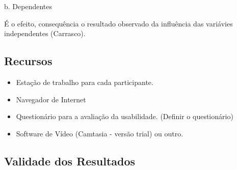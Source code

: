 
b. Dependentes

É o efeito, consequência o resultado observado da influência das variávies independentes (Carrasco).


\subsection{Recursos}

\begin{itemize}
\item Estação de trabalho para cada participante.
\item Navegador de Internet
\item Questionário para a avaliação da usabilidade. (Definir o questionário)
\item Software de Vídeo (Camtasia - versão trial) ou outro.
\end{itemize}

\subsection{Validade dos Resultados}

